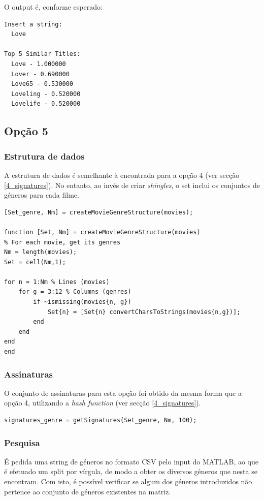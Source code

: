 \documentclass[portuguese, 11pt, a4paper,titlepage, oneside]{article}
\begin{document}
O output é, conforme esperado:
\begin{lstlisting}[style=Matlab-editor]
Insert a string: 
  Love

Top 5 Similar Titles:
  Love - 1.000000
  Lover - 0.690000
  Love65 - 0.530000
  Loveling - 0.520000
  Lovelife - 0.520000
\end{lstlisting}

\subsection{Opção 5}
\subsubsection{Estrutura de dados}
A estrutura de dados é semelhante à encontrada para a opção 4 (ver secção \ref{4_signatures}). No entanto, ao invés de criar \textit{shingles}, o set inclui os conjuntos de géneros para cada filme.

\begin{lstlisting}[style=Matlab-editor]
[Set_genre, Nm] = createMovieGenreStructure(movies);

function [Set, Nm] = createMovieGenreStructure(movies)
% For each movie, get its genres
Nm = length(movies);
Set = cell(Nm,1);

for n = 1:Nm % Lines (movies)
    for g = 3:12 % Columns (genres)
        if ~ismissing(movies{n, g})
            Set{n} = [Set{n} convertCharsToStrings(movies{n,g})];
        end
    end
end
end
\end{lstlisting}

\subsubsection{Assinaturas}
O conjunto de assinaturas para esta opção foi obtido da mesma forma que a opção 4, utilizando a \textit{hash function} (ver secção \ref{4_signatures}).

\begin{lstlisting}[style=Matlab-editor]
signatures_genre = getSignatures(Set_genre, Nm, 100);
\end{lstlisting}

\subsubsection{Pesquisa}
É pedida uma string de géneros no formato CSV pelo input do MATLAB, ao que é efetuado um split por vírgula, de modo a obter os diversos géneros que nesta se encontram. Com isto, é possível verificar se algum dos géneros introduzidos não pertence ao conjunto de géneros existentes na matriz.
\end{document}
